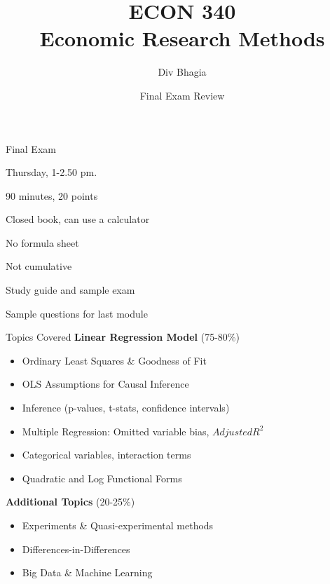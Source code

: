\documentclass{./../div_teaching_slides}
\begin{document}
\title{ECON 340 \\ Economic Research Methods}
\author{Div Bhagia}
\date{Final Exam Review}

\begin{frame}
\maketitle
\end{frame}

\begin{frame}{Final Exam}
\begin{witemize}
 \item Thursday, 1-2.50 pm.
  \item 90 minutes, 20 points
  \item Closed book, can use a calculator
  \item No formula sheet 
  \item Not cumulative 
  \item Study guide and sample exam 
  \item Sample questions for last module
\end{witemize}
\end{frame}

\begin{frame}{Topics Covered}
\vspace{-0.5em}
\textbf{Linear Regression Model} (75-80\%) \vspace{0.1em}
\begin{itemize}
  \item Ordinary Least Squares \& Goodness of Fit
  \item OLS Assumptions for Causal Inference
  \item Inference (p-values, t-stats, confidence intervals)
  \item Multiple Regression: Omitted variable bias, $Adjusted R^2$
  \item Categorical variables, interaction terms
  \item Quadratic and Log Functional Forms
\end{itemize}
\vspace{0.5em}
\textbf{Additional Topics} (20-25\%)\vspace{0.1em}
\begin{itemize}
  \item Experiments \& Quasi-experimental methods
  \item Differences-in-Differences
  \item Big Data \& Machine Learning
\end{itemize}
\end{frame}
\end{document}
